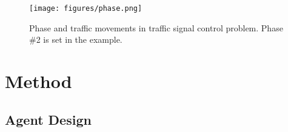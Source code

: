 \begin{figure}
    \centering
    \texttt{[image: figures/phase.png]}
    \caption{Phase and traffic movements in traffic signal control problem. Phase \#2 is set in the example.}
    \label{fig:preliminary}
\end{figure}

\vspace{-2mm}
\section{Method}

\subsection{Agent Design}
\label{sec:formulation}

